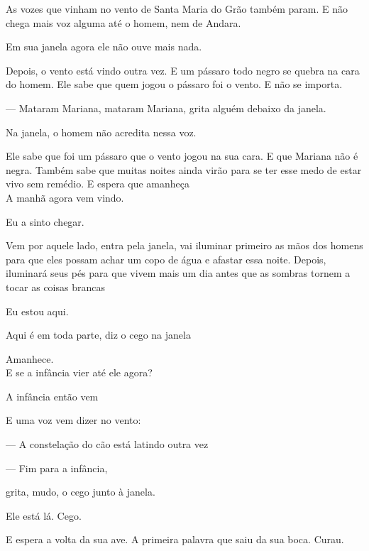 As vozes que vinham no vento de Santa Maria do Grão também param. E não
chega mais voz alguma até o homem, nem de Andara.

Em sua janela agora ele não ouve mais nada.

Depois, o vento está vindo outra vez. E um pássaro todo negro se quebra
na cara do homem. Ele sabe que quem jogou o pássaro foi o vento. E não
se importa.

--- Mataram Mariana, mataram Mariana, grita alguém debaixo da janela.

Na janela, o homem não acredita nessa voz.

Ele sabe que foi um pássaro que o vento jogou na sua cara. E que Mariana
não é negra. Também sabe que muitas noites ainda virão para se ter esse
medo de estar vivo sem remédio. E espera que amanheça\\

A manhã agora vem vindo.

Eu a sinto chegar.

Vem por aquele lado, entra pela janela, vai iluminar primeiro as mãos
dos homens para que eles possam achar um copo de água e afastar essa
noite. Depois, iluminará seus pés para que vivem mais um dia antes que
as sombras tornem a tocar as coisas brancas

Eu estou aqui.

Aqui é em toda parte, diz o cego na janela

\pagebreak

\clearpage
\thispagestyle{empty}

\movetoevenpage

\vspace*{4cm}

Amanhece.\\

E se a infância vier até ele agora?

A infância então vem

E uma voz vem dizer no vento:

--- A constelação do cão está latindo outra vez

\pagebreak

\vspace*{4cm}

--- Fim para a infância,

grita, mudo, o cego junto à janela.

Ele está lá. Cego.

E espera a volta da sua ave. A primeira palavra que saiu da sua boca.
Curau.

